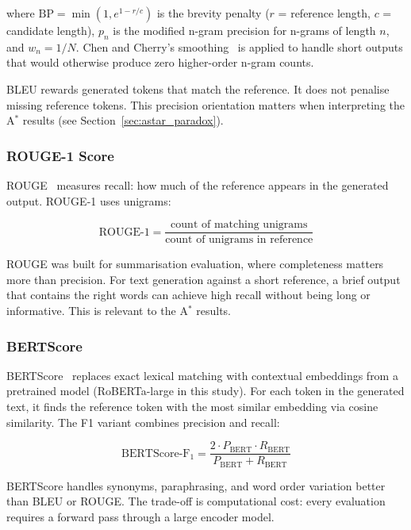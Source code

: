 \documentclass[12pt]{article}
\begin{document}
	where $\mathrm{BP} = \min(1, e^{1-r/c})$ is the brevity penalty ($r$ = reference length, $c$ = candidate length), $p_n$ is the modified n-gram precision for n-grams of length $n$, and $w_n = 1/N$. Chen and Cherry's smoothing~\cite{chen2014bleu_smooth} is applied to handle short outputs that would otherwise produce zero higher-order n-gram counts.
	
	BLEU rewards generated tokens that match the reference. It does not penalise missing reference tokens. This precision orientation matters when interpreting the A$^*$ results (see Section~\ref{sec:astar_paradox}).
	
	\subsubsection{ROUGE-1 Score}
	
	ROUGE~\cite{lin2004rouge} measures recall: how much of the reference appears in the generated output. ROUGE-1 uses unigrams:
	
	\begin{equation}
		\mathrm{ROUGE\text{-}1} = \frac{\text{count of matching unigrams}}{\text{count of unigrams in reference}}
		\label{eq:rouge}
	\end{equation}
	
	ROUGE was built for summarisation evaluation, where completeness matters more than precision. For text generation against a short reference, a brief output that contains the right words can achieve high recall without being long or informative. This is relevant to the A$^*$ results.
	
	\subsubsection{BERTScore}
	
	BERTScore~\cite{zhang2020bertscore} replaces exact lexical matching with contextual embeddings from a pretrained model (RoBERTa-large in this study). For each token in the generated text, it finds the reference token with the most similar embedding via cosine similarity. The F1 variant combines precision and recall:
	
	\begin{equation}
		\mathrm{BERTScore\text{-}F_1} = \frac{2 \cdot P_{\mathrm{BERT}} \cdot R_{\mathrm{BERT}}}{P_{\mathrm{BERT}} + R_{\mathrm{BERT}}}
		\label{eq:bertscore}
	\end{equation}
	
	BERTScore handles synonyms, paraphrasing, and word order variation better than BLEU or ROUGE. The trade-off is computational cost: every evaluation requires a forward pass through a large encoder model.
	
\end{document}
